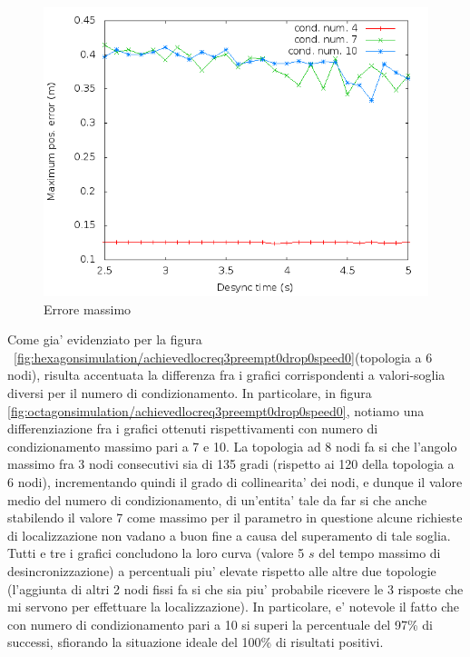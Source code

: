 \begin{figure}[H]
    \centering
    \includegraphics[scale=0.5]{octagonsimulation/maxposerrorreq3preempt0drop0speed0.png}
    \caption{Errore massimo}
    \label{fig:octagonsimulation/maxposerrorreq3preempt0drop0speed0}
\end{figure}
Come gia' evidenziato per la figura ~\ref{fig:hexagonsimulation/achievedlocreq3preempt0drop0speed0}(topologia a 6 nodi), risulta accentuata la differenza fra i grafici corrispondenti a valori-soglia diversi per il numero di condizionamento. In particolare, in figura \ref{fig:octagonsimulation/achievedlocreq3preempt0drop0speed0}, notiamo una differenziazione fra i grafici ottenuti rispettivamenti con numero di condizionamento massimo pari a 7 e 10. La topologia ad 8 nodi fa si che l'angolo massimo fra 3 nodi consecutivi sia di 135 gradi (rispetto ai 120 della topologia a 6 nodi), incrementando quindi il grado di collinearita' dei nodi, e dunque il valore medio del numero di condizionamento, di un'entita' tale da far si che anche stabilendo il valore 7 come massimo per il parametro in questione alcune richieste di localizzazione non vadano a buon fine a causa del superamento di tale soglia.
Tutti e tre i grafici concludono la loro curva (valore 5 $s$ del tempo massimo di desincronizzazione) a percentuali piu' elevate rispetto alle altre due topologie (l'aggiunta di altri 2 nodi fissi fa si che sia piu' probabile ricevere le 3 risposte che mi servono per effettuare la localizzazione). In particolare, e' notevole il fatto che  con numero di condizionamento pari a 10 si superi la percentuale del 97\% di successi, sfiorando la situazione ideale del 100\% di risultati positivi.
